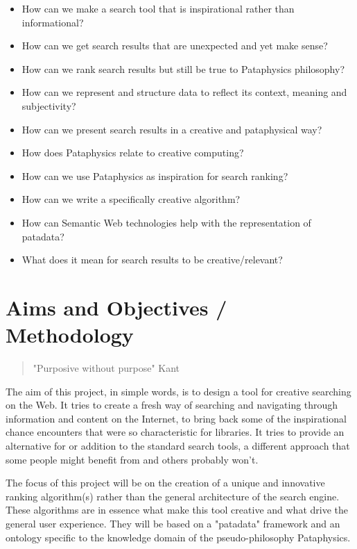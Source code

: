 \begin{itemize}
  \item How can we make a search tool that is inspirational rather than informational?
  \item How can we get search results that are unexpected and yet make sense?
  \item How can we rank search results but still be true to Pataphysics philosophy?
  \item How can we represent and structure data to reflect its context, meaning and subjectivity?
  \item How can we present search results in a creative and pataphysical way?
  \item How does Pataphysics relate to creative computing?
  \item How can we use Pataphysics as inspiration for search ranking?
  \item How can we write a specifically creative algorithm?
  \item How can Semantic Web technologies help with the representation of patadata?
  \item What does it mean for search results to be creative/relevant?
\end{itemize}

\section{Aims and Objectives / Methodology}

\begin{quote}
  "Purposive without purpose" Kant
\end{quote}

The aim of this project, in simple words, is to design a tool for creative searching on the Web. It tries to create a fresh way of searching and navigating through information and content on the Internet, to bring back some of the inspirational chance encounters that were so characteristic for libraries. It tries to provide an alternative for or addition to the standard search tools, a different approach that some people might benefit from and others probably won't.

The focus of this project will be on the creation of a unique and innovative ranking algorithm(s) rather than the general architecture of the search engine. These algorithms are in essence what make this tool creative and what drive the general user experience. They will be based on a "patadata" framework and an ontology specific to the knowledge domain of the pseudo-philosophy Pataphysics.

